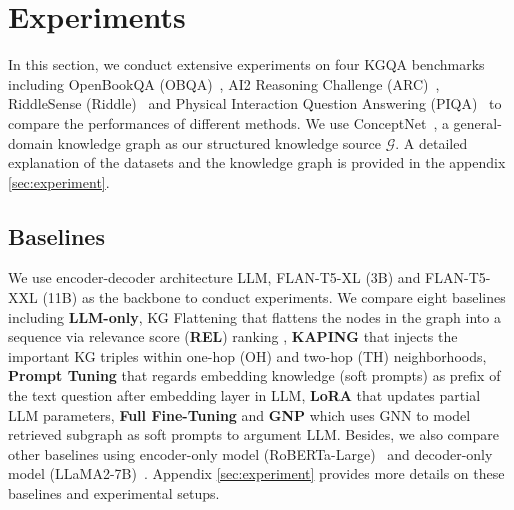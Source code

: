 \documentclass[11pt]{article}
\begin{document}
\section{Experiments}
In this section, we conduct extensive experiments on four KGQA benchmarks including OpenBookQA (OBQA)~\cite{obqa}, AI2 Reasoning Challenge (ARC)~\cite{arc}, RiddleSense (Riddle)~\cite{riddle} and Physical Interaction Question Answering (PIQA)~\cite{piqa} to compare the performances of different methods. We use ConceptNet~\cite{cpnet}, a general-domain knowledge graph as our structured knowledge source $\mathcal{G}$. A detailed explanation of the datasets and the knowledge graph is provided in the appendix \ref{sec:experiment}. 


\subsection{Baselines}
We use encoder-decoder architecture LLM, FLAN-T5-XL (3B) and FLAN-T5-XXL (11B) \cite{flan} as the backbone to conduct experiments. We compare eight baselines including \textbf{LLM-only}, KG Flattening that flattens the nodes in the graph into a sequence via relevance score (\textbf{REL}) ranking \cite{rel}, \textbf{KAPING} \cite{kaping} that injects the important KG triples within one-hop (OH) and two-hop (TH) neighborhoods, \textbf{Prompt Tuning} \cite{prompt_tuning} that regards embedding knowledge (soft prompts) as prefix of the text question after embedding layer in LLM, \textbf{LoRA} \cite{lora} that updates partial LLM parameters, \textbf{Full Fine-Tuning} and \textbf{GNP} \cite{gnp} which uses GNN to model retrieved subgraph as soft prompts to argument LLM. Besides, we also compare other baselines using encoder-only model (RoBERTa-Large)~\cite{roberta} and decoder-only model (LLaMA2-7B)~\citealt{llama2}. Appendix \ref{sec:experiment} provides more details on these baselines and experimental setups.
\end{document}
